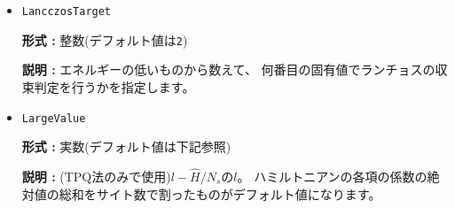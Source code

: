 \begin{itemize}
{\bf 形式 :} 整数(デフォルト値は\verb|14|)

{\bf 説明 :} ランチョスの収束判定条件を指定します。
ひとつ前のステップの固有値との相対誤差が, $10^{-{\tt LanczosEps}}$以下になったら収束したと判断します。

\item \verb|LancczosTarget|

{\bf 形式 :} 整数(デフォルト値は\verb|2|)

{\bf 説明 :} エネルギーの低いものから数えて、
何番目の固有値でランチョスの収束判定を行うかを指定します。

\item \verb|LargeValue|

{\bf 形式 :} 実数(デフォルト値は下記参照)

{\bf 説明 :} (TPQ法のみで使用)$l-\hat{H}/N_{s}$の$l$。
ハミルトニアンの各項の係数の絶対値の総和をサイト数で割ったものがデフォルト値になります。





%
%
%


\end{itemize}
